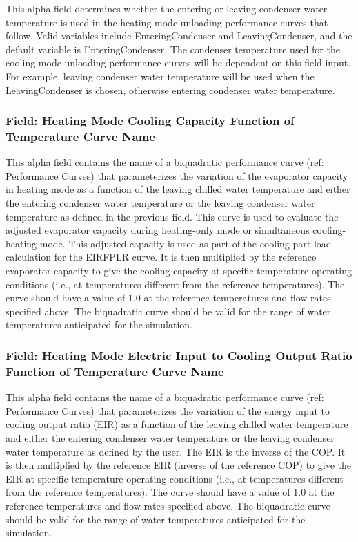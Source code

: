This alpha field determines whether the entering or leaving condenser water temperature is used in the heating mode unloading performance curves that follow. Valid variables include EnteringCondenser and LeavingCondenser, and the default variable is EnteringCondenser. The condenser temperature used for the cooling mode unloading performance curves will be dependent on this field input. For example, leaving condenser water temperature will be used when the LeavingCondenser is chosen, otherwise entering condenser water temperature.

\subsubsection{Field: Heating Mode Cooling Capacity Function of Temperature Curve Name}\label{field-heating-mode-cooling-capacity-function-of-temperature-curve-name}

This alpha field contains the name of a biquadratic performance curve (ref: Performance Curves) that parameterizes the variation of the evaporator capacity in heating mode as a function of the leaving chilled water temperature and either the entering condenser water temperature or the leaving condenser water temperature as defined in the previous field. This curve is used to evaluate the adjusted evaporator capacity during heating-only mode or simultaneous cooling-heating mode. This adjusted capacity is used as part of the cooling part-load calculation for the EIRFPLR curve. It is then multiplied by the reference evaporator capacity to give the cooling capacity at specific temperature operating conditions (i.e., at temperatures different from the reference temperatures). The curve should have a value of 1.0 at the reference temperatures and flow rates specified above. The biquadratic curve should be valid for the range of water temperatures anticipated for the simulation.

\subsubsection{Field: Heating Mode Electric Input to Cooling Output Ratio Function of Temperature Curve Name}\label{field-heating-mode-electric-input-to-cooling-output-ratio-function-of-temperature-curve-name}

This alpha field contains the name of a biquadratic performance curve (ref: Performance Curves) that parameterizes the variation of the energy input to cooling output ratio (EIR) as a function of the leaving chilled water temperature and either the entering condenser water temperature or the leaving condenser water temperature as defined by the user. The EIR is the inverse of the COP. It is then multiplied by the reference EIR (inverse of the reference COP) to give the EIR at specific temperature operating conditions (i.e., at temperatures different from the reference temperatures). The curve should have a value of 1.0 at the reference temperatures and flow rates specified above. The biquadratic curve should be valid for the range of water temperatures anticipated for the simulation.

